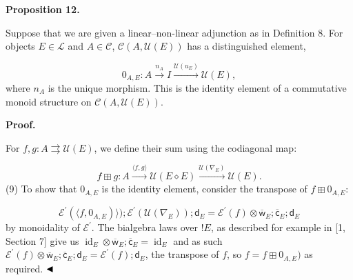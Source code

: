 \documentclass[10pt,a4paper]{article}
\newcommand{\oc}{!}
\begin{document}
 
 
\par\medskip\noindent\textbf{Proposition 12.}\par
 
 
Suppose that we are given a linear–non-linear adjunction as in Definition 8. For objects $E\in\mathscr{L}$ and $A\in\mathscr{C}$, $\mathscr{C}(A,\mathcal{U}(E))$ has a distinguished element,\par
    \[0_{A,E}:A\xrightarrow{n_{A}}I\xrightarrow{\mathcal{U}(u_{E})}\mathcal{U}(E),\]    
where $n_{A}$ is the unique morphism. This is the identity element of a commutative monoid structure on $\mathscr{C}(A,\mathcal{U}(E))$.\par
 
 
 
 
 
\par\medskip\noindent\textbf{Proof.}\par
 
 
For $f,g:A\rightrightarrows\mathcal{U}(E)$, we define their sum using the codiagonal map:\par
    \[f\boxplus g:A\xrightarrow{\langle f,g\rangle}\mathcal{U}(E\diamond E)\xrightarrow{\mathcal{U}(\nabla_{E})}\mathcal{U}(E).\]  (9)   
To show that $0_{A,E}$ is the identity element, consider the transpose of $f\boxplus 0_{A,E}$:\par
    \[\mathcal{E}^{\prime}(\langle f,0_{A,E})\rangle);\mathcal{E}^{\prime}(\mathcal{U}(\nabla_{E}));{\mathsf{d}}_{E}=\mathcal{E}^{\prime}(f)\otimes\overline{\mathsf{w}}_{E};\overline{\mathsf{c}}_{E};{\mathsf{d}}_{E}\]    
by monoidality of $\mathcal{E}^{\prime}$. The bialgebra laws over $\oc E$, as described for example in [1, Section 7] give us $\operatorname{id}_{E}\otimes\overline{\mathsf{w}}_{E};\overline{\mathsf{c}}_{E}=\operatorname{id}_{E}$ and as such $\mathcal{E}^{\prime}(f)\otimes\overline{\mathsf{w}}_{E};\overline{\mathsf{c}}_{E};{\mathsf{d}}_{E}=\mathcal{E}^{\prime}(f);{\mathsf{d}}_{E}$, the transpose of $f$, so $f=f\boxplus 0_{A,E})$ as required. $\hfill\blacktriangleleft$\par
 
\end{document}
